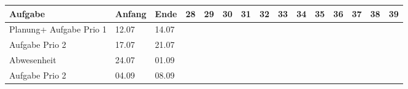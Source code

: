 \begin{landscape}
    
    \begin{tabularx}{21cm}{|l|l|l|X|X|X|X|X|X|X|X|X|X|X|X|}
        \hline
        \textbf{Aufgabe}                       & \textbf{Anfang} & \textbf{Ende} & \textbf{28}            & \textbf{29}            & \textbf{30}            & \textbf{31}            & \textbf{32}            & \textbf{33}            & \textbf{34}            & \textbf{35}            & \textbf{36}            & \textbf{37}            & \textbf{38}            & \textbf{39}            \\ \hline
        Planung+ Aufgabe Prio 1                & 12.07           & 14.07         & \cellcolor[HTML]{34CDF9} &                          &                          &                          &                          &                          &                          &                          &                          &                          &                          &                          \\ \hline
        Aufgabe Prio 2                         & 17.07           & 21.07         &                          & \cellcolor[HTML]{34CDF9} &                          &                          &                          &                          &                          &                          &                          &                          &                          &                          \\ \hline
        Abwesenheit                            & 24.07           & 01.09         &                          &                          & \cellcolor[HTML]{C0C0C0} & \cellcolor[HTML]{C0C0C0} & \cellcolor[HTML]{C0C0C0} & \cellcolor[HTML]{C0C0C0} & \cellcolor[HTML]{C0C0C0} & \cellcolor[HTML]{C0C0C0} &                          &                          &                          &                          \\ \hline
        Aufgabe Prio 2                         & 04.09           & 08.09         &                          &                          &                          &                          &                          &                          &                          &                          & \cellcolor[HTML]{34CDF9} &                          &                          &                          \\ \hline

\end{tabularx}
\end{landscape}
